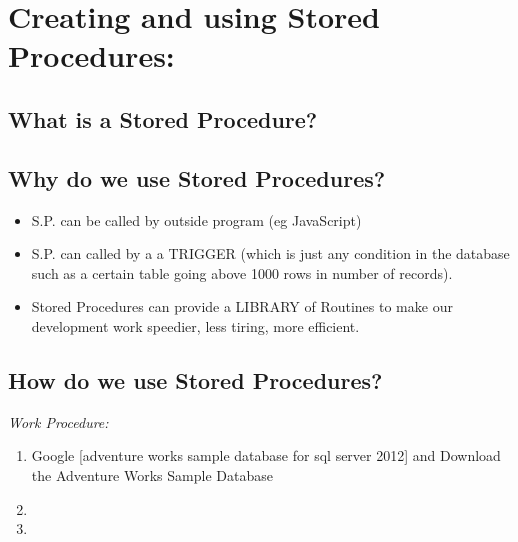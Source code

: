\section {Creating and using Stored Procedures:}


\subsection{What is a Stored Procedure?}


\subsection{Why do we use Stored Procedures?}
\begin{itemize}
    \item S.P. can be called by outside program (eg JavaScript)
    \item S.P. can called by a a TRIGGER (which is just any condition in the database
    such as a certain table going above 1000 rows in number of records).
    \item Stored Procedures can provide a LIBRARY of Routines to make our development
    work speedier, less tiring, more efficient.
\end{itemize}

\subsection{How do we use Stored Procedures?}



\emph{Work Procedure:}

\begin{enumerate}
    \item Google [adventure works sample database for sql server 2012] and Download the Adventure Works Sample Database
    \item 
    \item 
\end{enumerate}


